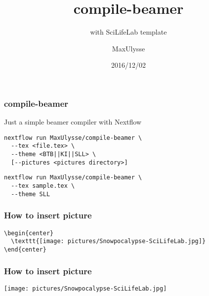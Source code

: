 \documentclass{beamer}
\title{compile-beamer}
\subtitle{with SciLifeLab template}
\author{MaxUlysse}
\institute{Barntumörbanken / SciLifeLab}
\date{2016/12/02}
\begin{document}
\begin{frame}
	\titlepage
\end{frame}

\begin{frame}[fragile]
	\frametitle{compile-beamer}
	Just a simple beamer compiler with Nextflow
	\begin{verbatim}
nextflow run MaxUlysse/compile-beamer \
  --tex <file.tex> \
  --theme <BTB||KI||SLL> \
  [--pictures <pictures directory>]
	\end{verbatim}
	\begin{verbatim}
nextflow run MaxUlysse/compile-beamer \
  --tex sample.tex \
  --theme SLL
	\end{verbatim}
\end{frame}

\begin{frame}[fragile]
	\frametitle{How to insert picture}
	\begin{verbatim}
\begin{center}
  \texttt{[image: pictures/Snowpocalypse-SciLifeLab.jpg]}
\end{center}
	\end{verbatim}
\end{frame}

\begin{frame}
	\frametitle{How to insert picture}
	\begin{center}
		\texttt{[image: pictures/Snowpocalypse-SciLifeLab.jpg]}
	\end{center}
\end{frame}
\end{document}
